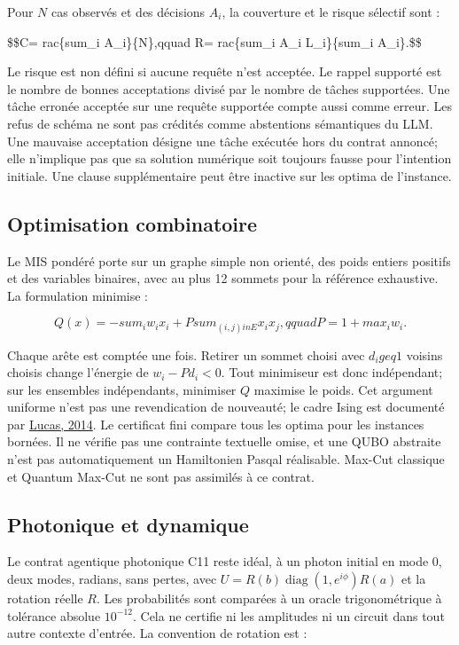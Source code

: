 \documentclass[11pt]{article}
\begin{document}
Pour $N$ cas observés et des décisions $A_i$, la couverture et le risque sélectif sont :

\$\$C=
rac\{sum\_i A\_i\}\{N\},qquad R=
rac\{sum\_i A\_i L\_i\}\{sum\_i A\_i\}.\$\$

Le risque est non défini si aucune requête n'est acceptée. Le rappel supporté est le nombre de bonnes acceptations divisé par le nombre de tâches supportées. Une tâche erronée acceptée sur une requête supportée compte aussi comme erreur. Les refus de schéma ne sont pas crédités comme abstentions sémantiques du LLM. Une mauvaise acceptation désigne une tâche exécutée hors du contrat annoncé; elle n'implique pas que sa solution numérique soit toujours fausse pour l'intention initiale. Une clause supplémentaire peut être inactive sur les optima de l'instance.

\subsection{Optimisation combinatoire}

Le MIS pondéré porte sur un graphe simple non orienté, des poids entiers positifs et des variables binaires, avec au plus 12 sommets pour la référence exhaustive. La formulation minimise :

\[Q(x)=-sum_iw_ix_i+Psum_{(i,j)in E}x_ix_j,qquad P=1+max_iw_i.\]

Chaque arête est comptée une fois. Retirer un sommet choisi avec $d_igeq1$ voisins choisis change l'énergie de $w_i-Pd_i<0$. Tout minimiseur est donc indépendant; sur les ensembles indépendants, minimiser $Q$ maximise le poids. Cet argument uniforme n'est pas une revendication de nouveauté; le cadre Ising est documenté par \href{\detokenize{https://doi.org/10.3389/fphy.2014.00005}}{Lucas, 2014}. Le certificat fini compare tous les optima pour les instances bornées. Il ne vérifie pas une contrainte textuelle omise, et une QUBO abstraite n'est pas automatiquement un Hamiltonien Pasqal réalisable. Max-Cut classique et Quantum Max-Cut ne sont pas assimilés à ce contrat.

\subsection{Photonique et dynamique}

Le contrat agentique photonique C11 reste idéal, à un photon initial en mode 0, deux modes, radians, sans pertes, avec $U=R(b)\operatorname{diag}(1,e^{i\phi})R(a)$ et la rotation réelle $R$. Les probabilités sont comparées à un oracle trigonométrique à tolérance absolue $10^{-12}$. Cela ne certifie ni les amplitudes ni un circuit dans tout autre contexte d'entrée. La convention de rotation est :
\end{document}
